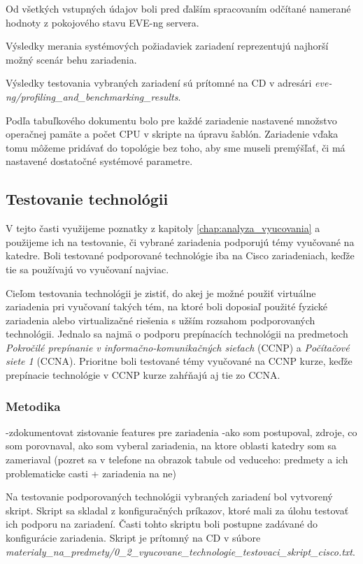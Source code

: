 Od všetkých vstupných údajov boli pred ďalším spracovaním odčítané namerané hodnoty z pokojového stavu EVE-ng servera.

Výsledky merania systémových požiadaviek zariadení reprezentujú najhorší možný scenár behu zariadenia.

Výsledky testovania vybraných zariadení sú prítomné na CD v adresári \emph{eve-ng/profiling\_and\_benchmarking\_results}.

Podľa tabuľkového dokumentu bolo pre každé zariadenie nastavené množstvo operačnej pamäte a počet CPU v skripte na úpravu šablón. Zariadenie vďaka tomu môžeme pridávať do topológie bez toho, aby sme museli premýšľať, či má nastavené dostatočné systémové parametre.




\subsection{Testovanie technológii}
\label{chap:testovanie_technologii}

V tejto časti využijeme poznatky z kapitoly \ref{chap:analyza_vyucovania} a použijeme ich na testovanie, či vybrané zariadenia podporujú témy vyučované na katedre. Boli testované podporované technológie iba na Cisco zariadeniach, keďže tie sa používajú vo vyučovaní najviac.

Cieľom testovania technológii je zistiť, do akej je možné použiť virtuálne zariadenia pri vyučovaní takých tém, na ktoré boli doposiaľ použité fyzické zariadenia alebo virtualizačné riešenia s užším rozsahom podporovaných technológii. Jednalo sa najmä o podporu prepínacích technológii na predmetoch \emph{Pokročilé prepínanie v informačno-komunikačných sieťach} (CCNP) a \emph{Počítačové siete 1} (CCNA). Prioritne boli testované témy vyučované na CCNP kurze, keďže prepínacie technológie v CCNP kurze zahŕňajú aj tie zo CCNA.



\subsubsection{Metodika}

-zdokumentovat zistovanie features pre zariadenia
        -ako som postupoval, zdroje, co som porovnaval, ako som vyberal zariadenia, na ktore oblasti katedry som sa zameriaval (pozret sa v telefone na obrazok tabule od veduceho: predmety a ich problematicke casti + zariadenia na ne)

Na testovanie podporovaných technológii vybraných zariadení bol vytvorený skript. Skript sa skladal z konfiguračných príkazov, ktoré mali za úlohu testovať ich podporu na zariadení. Časti tohto skriptu boli postupne zadávané do konfigurácie zariadenia. Skript je prítomný na CD v súbore \\
\emph{materialy\_na\_predmety/0\_2\_vyucovane\_technologie\_testovaci\_skript\_cisco.txt}.



